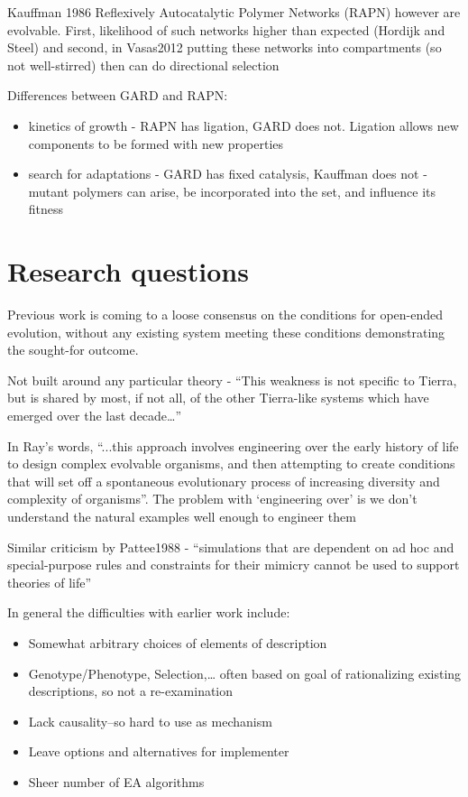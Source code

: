 Kauffman 1986 Reflexively Autocatalytic Polymer Networks (RAPN) however are evolvable. First, likelihood of such networks higher than expected (Hordijk and Steel) and second, in Vasas2012 putting these networks into compartments (so not well-stirred) then can do directional selection

Differences between GARD and RAPN:
\begin{itemize}
	\item
	kinetics of growth - RAPN has ligation, GARD does not. Ligation allows new components to be formed with new properties
	\item
	search for adaptations - GARD has fixed catalysis, Kauffman does not - mutant polymers can arise, be incorporated into the set, and influence its fitness
\end{itemize}

\section{Research questions}

Previous work is coming to a loose consensus on the conditions for open-ended evolution, without any existing system meeting these conditions demonstrating the sought-for outcome.

Not built around any particular theory - ``This weakness is not specific to Tierra, but is shared by most, if not all, of the other Tierra-like systems which have emerged over the last decade\ldots{}''\autocite{Taylor2001}

In Ray's words, ``...this approach involves engineering over the early history of life to design complex evolvable organisms, and then attempting to create conditions that will set off a spontaneous evolutionary process of increasing diversity and complexity of organisms''\autocite{Taylor2001}. The problem with `engineering over' is we don't understand the natural examples well enough to engineer them \autocite{Taylor2001}

Similar criticism by Pattee1988 - ``simulations that are dependent on ad hoc and special-purpose rules and constraints for their mimicry cannot be used to support theories of life'' \autocite{Taylor2001}

In general the difficulties with earlier work include:
\begin{itemize}
	\item Somewhat arbitrary choices of elements of description
	\item Genotype/Phenotype, Selection,\ldots{} often based on goal of rationalizing existing descriptions, so not a re-examination
	\item Lack causality--so hard to use as mechanism
	\item Leave options and alternatives for implementer
	\item Sheer number of EA algorithms
\end{itemize}

